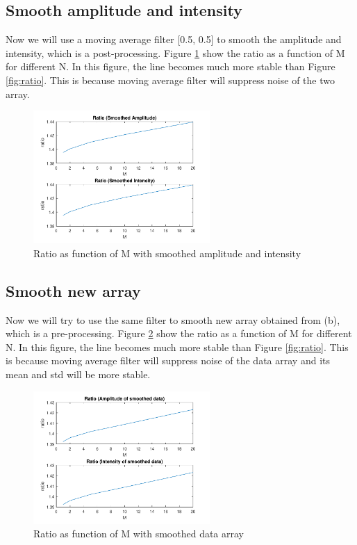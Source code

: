 \documentclass{article}
\begin{document}
\subsection{Smooth amplitude and intensity}
Now we will use a moving average filter [0.5, 0.5] to smooth the amplitude and intensity, which is a post-processing. 
Figure \ref{fig:ratio_smooth_later} show the ratio as a function of M for different N. In this figure, the line becomes much more stable than
Figure \ref{fig:ratio}. This is because moving average filter will suppress noise of the two array.
\begin{figure}[H]
	\centering
	\includegraphics[width = 0.6\textwidth]{src/2pi/ratio_smooth_later.pdf}
	\caption{Ratio as function of M with smoothed amplitude and intensity}
	\label{fig:ratio_smooth_later}
\end{figure}

\subsection{Smooth new array}
Now we will try to use the same filter to smooth new array obtained from (b), which is a pre-processing.
Figure \ref{fig:ratio_smooth_first} show the ratio as a function of M for different N. In this figure, the line becomes much more stable than
Figure \ref{fig:ratio}. This is because moving average filter will suppress noise of the data array and its mean and std will be more stable.
\begin{figure}[H]
	\centering
	\includegraphics[width = 0.6\textwidth]{src/2pi/ratio_smooth_first.pdf}
	\caption{Ratio as function of M with smoothed data array}
	\label{fig:ratio_smooth_first}
\end{figure}
\end{document}
